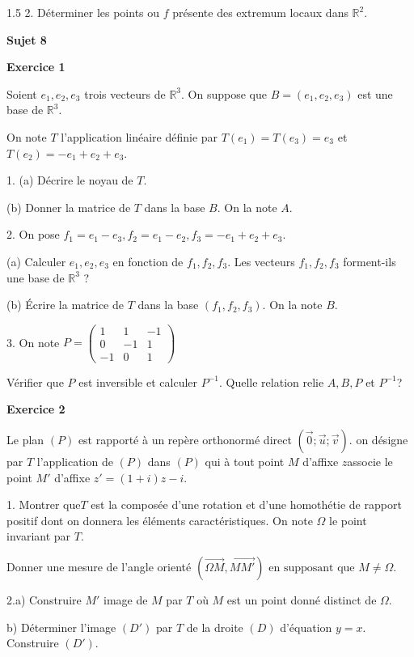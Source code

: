 \documentclass[12pt]{article}
\begin{document}
\begin{spacing}{1.5}
 2. Déterminer les points ou $f$ présente des extremum locaux dans $\mathbb{R}^2$.
 
 
 \quad

\medskip\textbf{Sujet 8}

\medskip\textbf{Exercice 1}

Soient $e_1, e_2, e_3$ trois vecteurs de $\mathbb{R}^3$. On suppose que $B = (e_1,e_2,e_3)$ est une base de $\mathbb{R}^3$.
 
 On note $T$ l'application linéaire définie par $T(e_1) = T(e_3) = e_3$ et $T(e_2) = -e_1+e_2+e_3$.

1. (a) Décrire le noyau de $T$.
 
 (b) Donner la matrice de $T$ dans la base $B$. On la note $A$.
 
 2. On pose $f_1 = e_1-e_3, f_2 = e_1-e_2, f_3 = -e_1 +e_2 +e_3$.
 
 (a) Calculer $e_1, e_2, e_3$ en fonction de $f_1, f_2, f_3$. Les vecteurs $f_1, f_2, f_3$ forment-ils
 une base de $\mathbb{R}^3$ ?
 
 (b) Écrire la matrice de $T$ dans la base $(f_1,f_2,f_3)$. On la note $B$.
 
3. On note $P= \begin{pmatrix}
1 & 1 & -1 \\ 
0 & -1 & 1 \\ 
-1 & 0 & 1
\end{pmatrix}$

Vérifier que $P$ est inversible et calculer $P^{-1}$. Quelle relation relie $A,B,P$ et $P^{-1}$?

\medskip\textbf{Exercice 2}

Le plan $(P)$ est rapporté à un repère orthonormé direct $(\overrightarrow{0} ; \overrightarrow{u}; \overrightarrow{v})$. 
on désigne par $T$ l'application de $(P)$ dans $(P)$ qui à tout point $M$ d'affixe $z $associe le point $M'$ d'affixe $z' = (1 + i)z-i$. 

1. Montrer que$ T$ est la composée d'une rotation et d'une homothétie de rapport positif dont on donnera les éléments caractéristiques. On note $\Omega$ le point invariant par $T$. 

Donner une mesure de l'angle orienté $(\overrightarrow{\Omega M},\overrightarrow{MM'}) \text{ en supposant que }  M\neq \Omega$.


2.a) Construire $M'$ image de $M$ par $T$ où $M$ est un point donné distinct de $\Omega$. 

b) Déterminer l'image $(D')$ par $T$ de la droite $(D)$ d'équation $y = x$. Construire $(D')$. 


\end{spacing}
\end{document}
